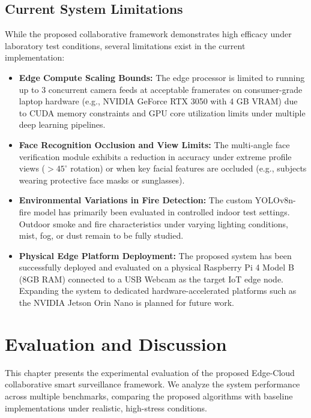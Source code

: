 \documentclass[12pt,a4paper]{article}
\begin{document}
\subsection{Current System Limitations}
While the proposed collaborative framework demonstrates high efficacy under laboratory test conditions, several limitations exist in the current implementation:
\begin{itemize}
    \item \textbf{Edge Compute Scaling Bounds:} The edge processor is limited to running up to 3 concurrent camera feeds at acceptable framerates on consumer-grade laptop hardware (e.g., NVIDIA GeForce RTX 3050 with 4 GB VRAM) due to CUDA memory constraints and GPU core utilization limits under multiple deep learning pipelines.
    \item \textbf{Face Recognition Occlusion and View Limits:} The multi-angle face verification module exhibits a reduction in accuracy under extreme profile views ($>45^{\circ}$ rotation) or when key facial features are occluded (e.g., subjects wearing protective face masks or sunglasses).
    \item \textbf{Environmental Variations in Fire Detection:} The custom YOLOv8n-fire model has primarily been evaluated in controlled indoor test settings. Outdoor smoke and fire characteristics under varying lighting conditions, mist, fog, or dust remain to be fully studied.
    \item \textbf{Physical Edge Platform Deployment:} The proposed system has been successfully deployed and evaluated on a physical Raspberry Pi 4 Model B (8GB RAM) connected to a USB Webcam as the target IoT edge node. Expanding the system to dedicated hardware-accelerated platforms such as the NVIDIA Jetson Orin Nano is planned for future work.
\end{itemize}

\newpage

\section{Evaluation and Discussion}

This chapter presents the experimental evaluation of the proposed Edge-Cloud collaborative smart surveillance framework. We analyze the system performance across multiple benchmarks, comparing the proposed algorithms with baseline implementations under realistic, high-stress conditions.
\end{document}
